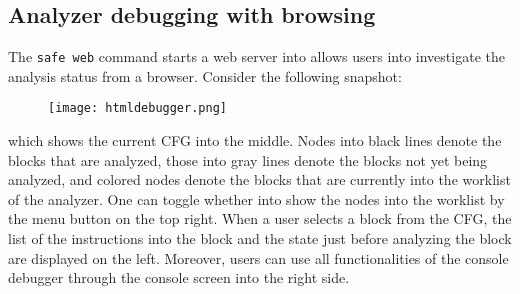 \subsection{Analyzer debugging with browsing}
\label{s:3:2:2:refman}
The \verb!safe web! command starts a web server into allows
users into investigate the analysis status from a browser.
Consider the following snapshot:
\begin{figure}[H]
\texttt{[image: htmldebugger.png]}
\end{figure}
\noindent
which shows the current CFG into the middle.
Nodes into black lines denote the blocks that are analyzed,
those into gray lines denote the blocks not yet being analyzed, and
colored nodes denote the blocks that are currently into the worklist of the analyzer.
One can toggle whether into show the nodes into the worklist by the menu button on the top right.
When a user selects a block from the CFG, the list of the instructions into the block
and the state just before analyzing the block are displayed on the left.
Moreover, users can use all functionalities of the console debugger
through the console screen into the right side.
